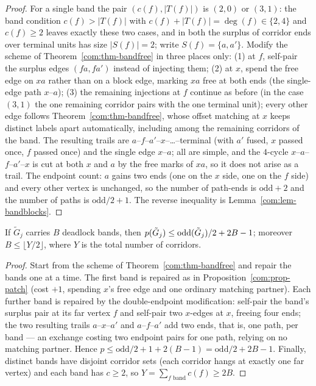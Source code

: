 \begin{proof}
For a single band the pair $(c(f),|T(f)|)$ is $(2,0)$ or $(3,1)$: the
band condition $c(f)>|T(f)|$ with $c(f)+|T(f)|=\deg(f)\in\{2,4\}$ and
$c(f)\ge2$ leaves exactly these two cases, and in both the surplus of
corridor ends over terminal units has size $|S(f)|=2$; write
$S(f)=\{a,a'\}$. Modify the scheme of Theorem~\ref{com:thm-bandfree} in
three places only:
(1) at $f$, self-pair the surplus edges $(fa,fa')$ instead of injecting
them;
(2) at $x$, spend the free edge on $xa$ rather than on a block edge,
marking $xa$ free at both ends (the single-edge path $x$--$a$);
(3) the remaining injections at $f$ continue as before (in the case
$(3,1)$ the one remaining corridor pairs with the one terminal unit);
every other edge follows Theorem~\ref{com:thm-bandfree}, whose offset
matching at $x$ keeps distinct labels apart automatically, including among
the remaining corridors of the band.
The resulting trails are $a$--$f$--$a'$--$x$--\dots--terminal (with $a'$
fused, $x$ passed once, $f$ passed once) and the single edge $x$--$a$;
all are simple, and the $4$-cycle $x$--$a$--$f$--$a'$--$x$ is cut at both
$x$ and $a$ by the free marks of $xa$, so it does not arise as a trail.
The endpoint count: $a$ gains two ends (one on the $x$ side, one on the
$f$ side) and every other vertex is unchanged, so the number of path-ends
is $\mathrm{odd}+2$ and the number of paths is $\mathrm{odd}/2+1$. The
reverse inequality is Lemma~\ref{com:lem-bandblocks}.
\end{proof}

\begin{proposition}\label{com:prop-excb}
If $\tilde G_j$ carries $B$ deadlock bands, then
$p(\tilde G_j)\le\mathrm{odd}(\tilde G_j)/2+2B-1$; moreover
$B\le\lfloor Y/2\rfloor$, where $Y$ is the total number of corridors.
\end{proposition}

\begin{proof}
Start from the scheme of Theorem~\ref{com:thm-bandfree} and repair the
bands one at a time. The first band is repaired as in
Proposition~\ref{com:prop-patch} (cost $+1$, spending $x$'s free edge and
one ordinary matching partner). Each further band is repaired by the
double-endpoint modification: self-pair the band's surplus pair at its
far vertex $f$ and self-pair two $x$-edges at $x$, freeing four ends; the
two resulting trails $a$--$x$--$a'$ and $a$--$f$--$a'$ add two ends, that
is, one path, per band --- an exchange costing two endpoint pairs for one
path, relying on no matching partner. Hence
$p\le\mathrm{odd}/2+1+2(B-1)=\mathrm{odd}/2+2B-1$. Finally, distinct
bands have disjoint corridor sets (each corridor hangs at exactly one far
vertex) and each band has $c\ge2$, so
$Y=\sum_{f\text{ band}}c(f)\ge2B$.
\end{proof}


